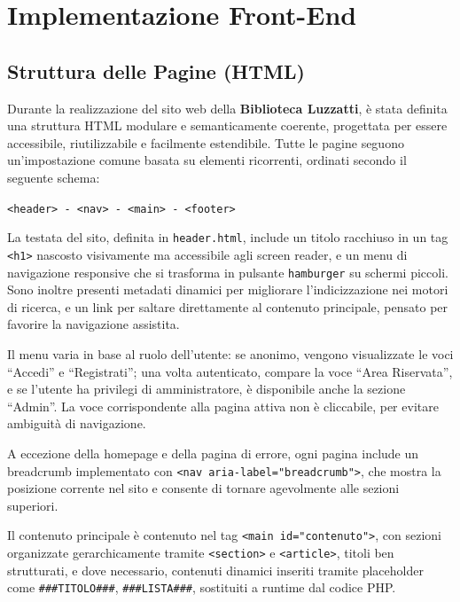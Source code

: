 \documentclass{article}
\begin{document}
\newpage

\section{Implementazione Front-End}

\subsection{Struttura delle Pagine (HTML)}

Durante la realizzazione del sito web della \textbf{Biblioteca Luzzatti}, è stata definita una struttura HTML modulare e semanticamente coerente, progettata per essere accessibile, riutilizzabile e facilmente estendibile.  
Tutte le pagine seguono un’impostazione comune basata su elementi ricorrenti, ordinati secondo il seguente schema:

\begin{center}
\texttt{\textless header\textgreater{} - \textless nav\textgreater{} - \textless main\textgreater{} - \textless footer\textgreater{}}
\end{center}

La testata del sito, definita in \texttt{header.html}, include un titolo racchiuso in un tag \texttt{<h1>} nascosto visivamente ma accessibile agli screen reader, e un menu di navigazione responsive che si trasforma in pulsante \texttt{hamburger} su schermi piccoli.  
Sono inoltre presenti metadati dinamici per migliorare l’indicizzazione nei motori di ricerca, e un link per saltare direttamente al contenuto principale, pensato per favorire la navigazione assistita.

Il menu varia in base al ruolo dell’utente: se anonimo, vengono visualizzate le voci “Accedi” e “Registrati”; una volta autenticato, compare la voce “Area Riservata”, e se l’utente ha privilegi di amministratore, è disponibile anche la sezione “Admin”. La voce corrispondente alla pagina attiva non è cliccabile, per evitare ambiguità di navigazione.

A eccezione della homepage e della pagina di errore, ogni pagina include un breadcrumb implementato con \texttt{<nav aria-label="breadcrumb">}, che mostra la posizione corrente nel sito e consente di tornare agevolmente alle sezioni superiori.

Il contenuto principale è contenuto nel tag \texttt{<main id="contenuto">}, con sezioni organizzate gerarchicamente tramite \texttt{<section>} e \texttt{<article>}, titoli ben strutturati, e dove necessario, contenuti dinamici inseriti tramite placeholder come \texttt{\#\#\#TITOLO\#\#\#}, \texttt{\#\#\#LISTA\#\#\#}, sostituiti a runtime dal codice PHP.
\end{document}
